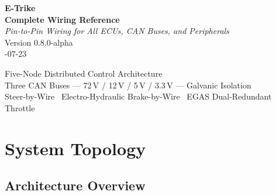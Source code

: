 \documentclass[12pt,a4paper,oneside]{report}
\begin{document}

\thispagestyle{empty}

\vspace*{60mm}

\begin{center}
  {\fontsize{28}{34}\selectfont\textbf{E-Trike}}\\[8mm]
  {\fontsize{22}{28}\selectfont\textbf{Complete Wiring Reference}}\\[20mm]
  {\fontsize{14}{18}\selectfont\textit{Pin-to-Pin Wiring for All ECUs, CAN Buses, and Peripherals}}\\[30mm]
  {\fontsize{12}{15}\selectfont Version 0.8.0-alpha}\\[4mm]
  {\fontsize{11}{14}-07-23}
\end{center}

\vfill

\begin{center}
  {\footnotesize
  Five-Node Distributed Control Architecture\\[2mm]
  Three CAN Buses --- 72\,V / 12\,V / 5\,V / 3.3\,V --- Galvanic Isolation\\[2mm]
  Steer-by-Wire \textbullet\ Electro-Hydraulic Brake-by-Wire \textbullet\ EGAS Dual-Redundant Throttle
  }
\end{center}

\newpage


\setcounter{tocdepth}{1}
\tableofcontents
\newpage


\chapter{System Topology}

\section{Architecture Overview}
\end{document}
